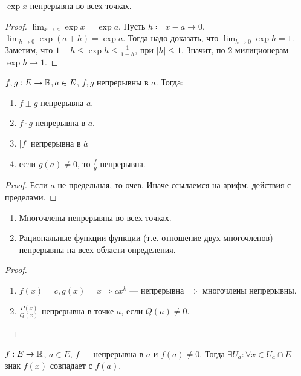 \begin{theorem}
    $\exp x$ непрерывна во всех точках.
\end{theorem}
\begin{proof}
    $\lim_{x\to a} \exp x = \exp a$. Пусть  $h \coloneqq x - a \to 0$.  $\lim_{h \to 0} \exp(a + h) = \exp a$. Тогда надо доказать, что  $\lim_{h \to 0} \exp h = 1$. Заметим, что  $1 + h \le \exp h \le \frac{1}{1- h}$, при $|h| \le 1$. Значит, по 2 милиционерам $\exp h \to 1$.
\end{proof}
\begin{theorem}
    $f, g: E \to \mathbb{R}, a \in E$,  $f, g$ непрерывны в  $a$.
    Тогда:
     \begin{enumerate}
         \item $f \pm g$ непрерывна   $a$.
         \item  $f \cdot g$ непрерывна в  $a$.
         \item  $|f|$ непрерывна в  $a$\.
         \item если  $g(a) \neq 0$, то  $\frac{f}{g}$ непрерывна.
    \end{enumerate}
\end{theorem}
\begin{proof}
    Если $a$ не предельная, то очев. Иначе ссылаемся на арифм. действия с пределами.
\end{proof}
\begin{consequence}
    \slashn
   \begin{enumerate}
       \item Многочлены непрерывны во всех точках.
       \item Рациональные функции функции (т.е. отношение двух многочленов) непрерывны на всех области определения.
   \end{enumerate} 
\end{consequence}
\begin{proof}
    \slashn
    \begin{enumerate}
        \item $f(x) = c, g(x) = x \Rightarrow c x^k$ --- непрерывна $\Rightarrow$ многочлены непрерывны.
        \item  $\frac{P(x)}{Q(x)}$ непрерывна в точке $a$, если  $Q(a) \neq 0$.
    \end{enumerate}
\end{proof}
\begin{theorem}
    $f: E \to \mathbb{R}$,  $a \in E$,  $f$ --- непрерывна в  $a$ и  $f(a) \neq 0$. Тогда  $\exists U_a: \forall x \in U_a \cap E$ знак $f(x)$ совпадает с  $f(a)$.
\end{theorem}
